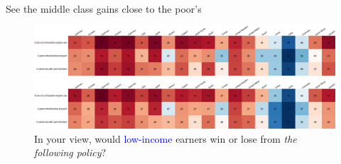\begin{frame}{See the middle class gains close to the poor's}%
	\begin{figure}[h!]
	\centering
	\caption{%
	In your view, would the \textcolor{blue}{middle-class} win or lose from \textit{the following policy}?}
	\includegraphics[width=\textwidth]{../figures/country_comparison/policies_win_lose_middle_positive_countries.png}
	\vspace{-.1cm}
	\centering
	\caption{%
	In your view, would \textcolor{blue}{low-income} earners win or lose from \textit{the following policy}?}
	\includegraphics[width=\textwidth]{../figures/country_comparison/policies_win_lose_poor_positive_countries.png}
	\end{figure}
\end{frame}
	
	
